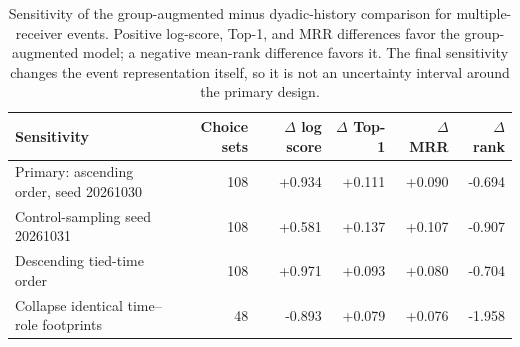 \begin{table}[t]
\centering
\caption{Sensitivity of the group-augmented minus dyadic-history comparison for multiple-receiver events. Positive log-score, Top-1, and MRR differences favor the group-augmented model; a negative mean-rank difference favors it. The final sensitivity changes the event representation itself, so it is not an uncertainty interval around the primary design.}
\label{tab:rhem-sensitivity}
\small
\begin{tabular}{lrrrrr}
\toprule
Sensitivity & Choice sets & $\Delta$ log score & $\Delta$ Top-1 & $\Delta$ MRR & $\Delta$ rank \\
\midrule
Primary: ascending order, seed 20261030 & 108 & +0.934 & +0.111 & +0.090 & -0.694 \\
Control-sampling seed 20261031 & 108 & +0.581 & +0.137 & +0.107 & -0.907 \\
Descending tied-time order & 108 & +0.971 & +0.093 & +0.080 & -0.704 \\
Collapse identical time--role footprints & 48 & -0.893 & +0.079 & +0.076 & -1.958 \\
\bottomrule
\end{tabular}
\end{table}
